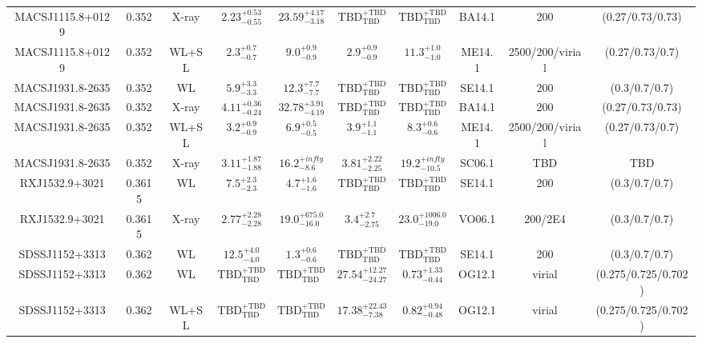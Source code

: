 \begin{table}
\begin{tabular}{cccccccccc}
MACSJ1115.8+0129 & 0.352 & X-ray & ${2.23}^{+0.53}_{-0.55}$ & ${23.59}^{+4.17}_{-3.18}$ & ${\mathrm{TBD}}^{+\mathrm{TBD}}_{\mathrm{TBD}}$ & ${\mathrm{TBD}}^{+\mathrm{TBD}}_{\mathrm{TBD}}$ & BA14.1 & 200 & (0.27/0.73/0.73) \\
MACSJ1115.8+0129 & 0.352 & WL+SL & ${2.3}^{+0.7}_{-0.7}$ & ${9.0}^{+0.9}_{-0.9}$ & ${2.9}^{+0.9}_{-0.9}$ & ${11.3}^{+1.0}_{-1.0}$ & ME14.1 & 2500/200/virial & (0.27/0.73/0.7) \\
MACSJ1931.8-2635 & 0.352 & WL & ${5.9}^{+3.3}_{-3.3}$ & ${12.3}^{+7.7}_{-7.7}$ & ${\mathrm{TBD}}^{+\mathrm{TBD}}_{\mathrm{TBD}}$ & ${\mathrm{TBD}}^{+\mathrm{TBD}}_{\mathrm{TBD}}$ & SE14.1 & 200 & (0.3/0.7/0.7) \\
MACSJ1931.8-2635 & 0.352 & X-ray & ${4.11}^{+0.36}_{-0.24}$ & ${32.78}^{+3.91}_{-4.19}$ & ${\mathrm{TBD}}^{+\mathrm{TBD}}_{\mathrm{TBD}}$ & ${\mathrm{TBD}}^{+\mathrm{TBD}}_{\mathrm{TBD}}$ & BA14.1 & 200 & (0.27/0.73/0.73) \\
MACSJ1931.8-2635 & 0.352 & WL+SL & ${3.2}^{+0.9}_{-0.9}$ & ${6.9}^{+0.5}_{-0.5}$ & ${3.9}^{+1.1}_{-1.1}$ & ${8.3}^{+0.6}_{-0.6}$ & ME14.1 & 2500/200/virial & (0.27/0.73/0.7) \\
MACSJ1931.8-2635 & 0.352 & X-ray & ${3.11}^{+1.87}_{-1.88}$ & ${16.2}^{+infty}_{-8.6}$ & ${3.81}^{+2.22}_{-2.25}$ & ${19.2}^{+infty}_{-10.5}$ & SC06.1 & TBD & TBD \\
RXJ1532.9+3021 & 0.3615 & WL & ${7.5}^{+2.3}_{-2.3}$ & ${4.7}^{+1.6}_{-1.6}$ & ${\mathrm{TBD}}^{+\mathrm{TBD}}_{\mathrm{TBD}}$ & ${\mathrm{TBD}}^{+\mathrm{TBD}}_{\mathrm{TBD}}$ & SE14.1 & 200 & (0.3/0.7/0.7) \\
RXJ1532.9+3021 & 0.3615 & X-ray & ${2.77}^{+2.28}_{-2.28}$ & ${19.0}^{+675.0}_{-16.0}$ & ${3.4}^{+2.7}_{-2.75}$ & ${23.0}^{+1006.0}_{-19.0}$ & VO06.1 & 200/2E4 & (0.3/0.7/0.7) \\
SDSSJ1152+3313 & 0.362 & WL & ${12.5}^{+4.0}_{-4.0}$ & ${1.3}^{+0.6}_{-0.6}$ & ${\mathrm{TBD}}^{+\mathrm{TBD}}_{\mathrm{TBD}}$ & ${\mathrm{TBD}}^{+\mathrm{TBD}}_{\mathrm{TBD}}$ & SE14.1 & 200 & (0.3/0.7/0.7) \\
SDSSJ1152+3313 & 0.362 & WL & ${\mathrm{TBD}}^{+\mathrm{TBD}}_{\mathrm{TBD}}$ & ${\mathrm{TBD}}^{+\mathrm{TBD}}_{\mathrm{TBD}}$ & ${27.54}^{+12.27}_{-24.27}$ & ${0.73}^{+1.33}_{-0.44}$ & OG12.1 & virial & (0.275/0.725/0.702) \\
SDSSJ1152+3313 & 0.362 & WL+SL & ${\mathrm{TBD}}^{+\mathrm{TBD}}_{\mathrm{TBD}}$ & ${\mathrm{TBD}}^{+\mathrm{TBD}}_{\mathrm{TBD}}$ & ${17.38}^{+22.43}_{-7.38}$ & ${0.82}^{+0.94}_{-0.48}$ & OG12.1 & virial & (0.275/0.725/0.702) \\

\end{tabular}
\end{table}
